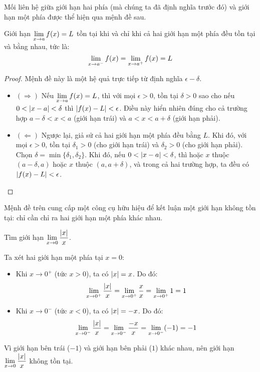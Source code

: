 Mối liên hệ giữa giới hạn hai phía (mà chúng ta đã định nghĩa trước đó) và giới hạn một phía được thể hiện qua mệnh đề sau.

\begin{proposition}
    \label{prop:limit-one-sided}
    Giới hạn $\lim\limits_{x \to a} f(x) = L$ tồn tại khi và chỉ khi cả hai giới hạn một phía đều tồn tại và bằng nhau, tức là:
    \begin{equation*}
        \lim\limits_{x \to a^{-}} f(x) = \lim\limits_{x \to a^{+}} f(x) = L
    \end{equation*}
\end{proposition}
\begin{proof}
    Mệnh đề này là một hệ quả trực tiếp từ định nghĩa $\epsilon-\delta$.
    \begin{itemize}
        \item $(\Rightarrow)$ Nếu $\lim\limits_{x \to a} f(x) = L$, thì với mọi $\epsilon > 0$, tồn tại $\delta > 0$ sao cho nếu $0 < \left\lvert x-a \right\rvert < \delta$ thì $\left\lvert f(x)-L \right\rvert < \epsilon$. Điều này hiển nhiên đúng cho cả trường hợp $a-\delta < x < a$ (giới hạn trái) và $a < x < a+\delta$ (giới hạn phải).
        \item $(\Leftarrow)$ Ngược lại, giả sử cả hai giới hạn một phía đều bằng $L$. Khi đó, với mọi $\epsilon > 0$, tồn tại $\delta_1 > 0$ (cho giới hạn trái) và $\delta_2 > 0$ (cho giới hạn phải). Chọn $\delta = \min\{\delta_1, \delta_2\}$. Khi đó, nếu $0 < \left\lvert x-a \right\rvert < \delta$, thì hoặc $x$ thuộc $(a-\delta, a)$ hoặc $x$ thuộc $(a, a+\delta)$, và trong cả hai trường hợp, ta đều có $\left\lvert f(x)-L \right\rvert < \epsilon$.
    \end{itemize}
\end{proof}

Mệnh đề trên cung cấp một công cụ hữu hiệu để kết luận một giới hạn không tồn tại: chỉ cần chỉ ra hai giới hạn một phía khác nhau.

\begin{example}
    Tìm giới hạn $\lim\limits_{x \to 0} \dfrac{\left\lvert x \right\rvert}{x}$.
    
    Ta xét hai giới hạn một phía tại $x=0$:
    \begin{itemize}
        \item Khi $x \to 0^{+}$ (tức $x>0$), ta có $\left\lvert x \right\rvert = x$. Do đó:
        \begin{equation*}
            \lim\limits_{x \to 0^{+}} \dfrac{\left\lvert x \right\rvert}{x} = \lim\limits_{x \to 0^{+}} \dfrac{x}{x} = \lim\limits_{x \to 0^{+}} 1 = 1
        \end{equation*}
        \item Khi $x \to 0^{-}$ (tức $x<0$), ta có $\left\lvert x \right\rvert = -x$. Do đó:
        \begin{equation*}
            \lim\limits_{x \to 0^{-}} \dfrac{\left\lvert x \right\rvert}{x} = \lim\limits_{x \to 0^{-}} \dfrac{-x}{x} = \lim\limits_{x \to 0^{-}} (-1) = -1
        \end{equation*}
    \end{itemize}
    Vì giới hạn bên trái ($-1$) và giới hạn bên phải ($1$) khác nhau, nên giới hạn $\lim\limits_{x \to 0} \dfrac{\left\lvert x \right\rvert}{x}$ không tồn tại.
\end{example}

